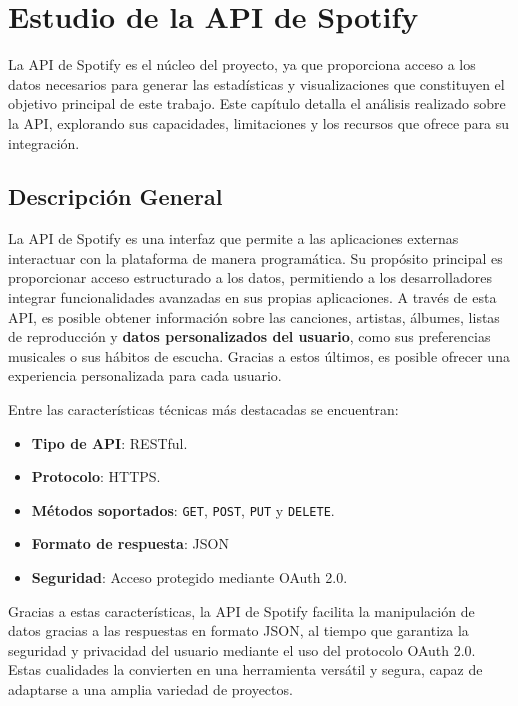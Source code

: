 \section{Estudio de la API de Spotify}

La API de Spotify es el núcleo del proyecto, ya que proporciona acceso a los datos necesarios para generar las estadísticas y visualizaciones que constituyen el objetivo principal de este trabajo. Este capítulo detalla el análisis realizado sobre la API, explorando sus capacidades, limitaciones y los recursos que ofrece para su integración.

\subsection{Descripción General}

La API de Spotify es una interfaz que permite a las aplicaciones externas interactuar con la plataforma de manera programática. Su propósito principal es proporcionar acceso estructurado a los datos, permitiendo a los desarrolladores integrar funcionalidades avanzadas en sus propias aplicaciones. A través de esta API, es posible obtener información sobre las canciones, artistas, álbumes, listas de reproducción y \textbf{datos personalizados del usuario}, como sus preferencias musicales o sus hábitos de escucha. Gracias a estos últimos, es posible ofrecer una experiencia personalizada para cada usuario.

Entre las características técnicas más destacadas se encuentran:

\begin{itemize}
    \item \textbf{Tipo de API}: RESTful.
    \item \textbf{Protocolo}: HTTPS.
    \item \textbf{Métodos soportados}: \texttt{GET}, \texttt{POST}, \texttt{PUT} y \texttt{DELETE}.
    \item \textbf{Formato de respuesta}: JSON
    \item \textbf{Seguridad}: Acceso protegido mediante OAuth 2.0.
\end{itemize}

Gracias a estas características, la API de Spotify facilita la manipulación de datos gracias a las respuestas en formato JSON, al tiempo que garantiza la seguridad y privacidad del usuario mediante el uso del protocolo OAuth 2.0. Estas cualidades la convierten en una herramienta versátil y segura, capaz de adaptarse a una amplia variedad de proyectos.

